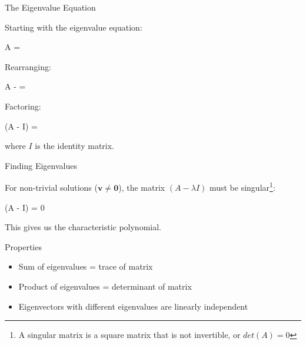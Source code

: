 \documentclass[aspectratio=169,xcolor=dvipsnames,svgnames,x11names,fleqn]{beamer}
\begin{document}
\begin{frame}{The Eigenvalue Equation}

Starting with the eigenvalue equation:
\begin{multiequation}
A = \lambda{}
\end{multiequation}

Rearranging:
\begin{multiequation}
A - \lambda{} = 
\end{multiequation}

Factoring:
\begin{multiequation}
(A - \lambda I) = 
\end{multiequation}

where $I$ is the identity matrix.

\end{frame}

\begin{frame}{Finding Eigenvalues}

For non-trivial solutions ($\mathbf{v} \neq \mathbf{0}$), the matrix $(A - \lambda I)$ must be singular\footnote{A singular matrix is a square matrix that is not invertible, or $det(A) = 0$}:

\begin{multiequation}
\det(A - \lambda I) = 0
\end{multiequation}

This gives us the \alert{characteristic polynomial}.

\vspace{5mm}

\begin{tblock}{Properties}
\begin{itemize}
    \item Sum of eigenvalues = trace of matrix
    \item Product of eigenvalues = determinant of matrix
    \item Eigenvectors with different eigenvalues are linearly independent
\end{itemize}
\end{tblock}

\end{frame}
\end{document}
